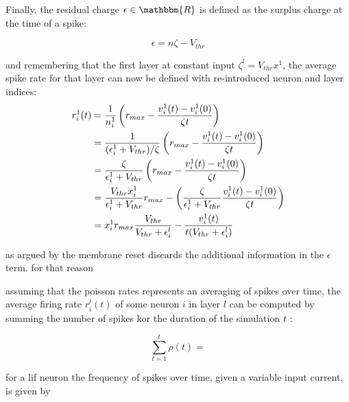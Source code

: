 \documentclass[report.tex]{subfiles}
\begin{document}
Finally, the residual charge $\epsilon \in \mathbbm{R}$ is defined as the surplus charge at the time of
a spike:

\begin{equation}
\epsilon = n\zeta - V_{thr}
\label{eq:charge_surplus}
\end{equation}

\noindent
and remembering that the first layer at constant input $\zeta^l = V_{thr}x^1$, the average spike rate
for that layer can now be defined with re-introduced neuron and layer indices:
\begin{equation}
\begin{split}
r_i^1(t) &= {1 \over n_i^1} \left(r_{max} - {v_i^1(t) - v_i^1(0) \over \zeta t}\right) \\
         &= {1 \over {(\epsilon_i^1 + V_{thr}) / \zeta}} \left(r_{max} - {v_i^1(t) - v_i^1(0) \over \zeta t}\right) \\
         &= {\zeta \over \epsilon_i^1 + V_{thr}} \left(r_{max} - {v_i^1(t) - v_i^1(0) \over \zeta t}\right) \\
         &= {V_{thr} x_i^1  \over \epsilon_i^1 + V_{thr}} r_{max}
          - \left({\zeta \over \epsilon_i^1 + V_{thr}} {v_i^1(t) - v_i^1(0) \over \zeta t}\right) \\
         &= x_i^1 r_{max} {V_{thr} \over V_{thr} + \epsilon_i^l } - {v_i^1(t) \over t (V_{thr} + \epsilon_i^l) } \\
\end{split}
\label{<+label+>}
\end{equation}

as argued by \citeauthor{rueckauer2017} the membrane reset discards the additional
information in the $\epsilon$ term.
for that reason

assuming that the poisson rates represents an averaging of spikes over time,
the average firing rate $r_i^l(t)$ of some neuron $i$ in layer $l$ can be computed
by summing the number of spikes kor the duration of the simulation $t$ \cite{rueckauer2017}:

\begin{equation}
\sum_{t=1}^t \rho(t) = 
\label{fig:lif-rate}
\end{equation}

for a lif neuron the frequency of spikes over time, given a variable input current,
is given by \cite[p.87]{eliasmith2004}
\end{document}
